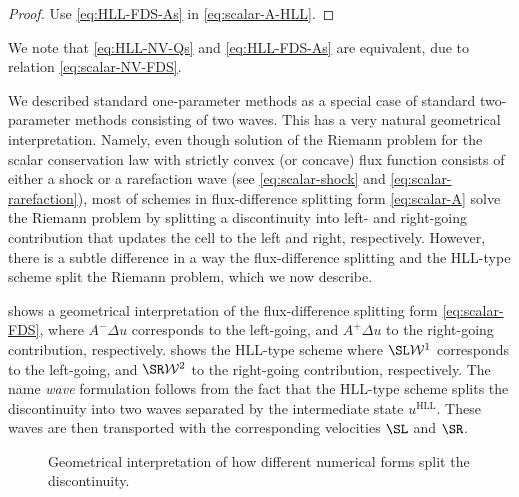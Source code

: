 \begin{proof}
Use \eqref{eq:HLL-FDS-As} in \eqref{eq:scalar-A-HLL}.
\end{proof}
We note that \eqref{eq:HLL-NV-Qs} and \eqref{eq:HLL-FDS-As} are equivalent, due to relation \eqref{eq:scalar-NV-FDS}.

We described standard one-parameter methods as a special case of standard two-parameter methods consisting of two waves. This has a very natural geometrical interpretation. Namely, even though solution of the Riemann problem for the scalar conservation law with strictly convex (or concave) flux function consists of either a shock or a rarefaction wave (see \eqref{eq:scalar-shock} and \eqref{eq:scalar-rarefaction}), most of schemes in flux-difference splitting form \eqref{eq:scalar-A} solve the Riemann problem by splitting a discontinuity into left- and right-going contribution that updates the cell to the left and right, respectively. However, there is a subtle difference in a way the flux-difference splitting and the HLL-type scheme split the Riemann problem, which we now describe.

 shows a geometrical interpretation of the flux-difference splitting form \eqref{eq:scalar-FDS}, where $ A^- \Delta u $ corresponds to the left-going, and $ A^+ \Delta u $ to the right-going contribution, respectively.  shows the HLL-type scheme where $ \SL \mathcal{W}^1 $ corresponds to the left-going, and $ \SR \mathcal{W}^2 $ to the right-going contribution, respectively. The name \textit{wave} formulation follows from the fact that the HLL-type scheme splits the discontinuity into two waves separated by the intermediate state $ u^\text{HLL} $. These waves are then transported with the corresponding velocities $ \SL $ and $ \SR $.
\begin{figure}[h!]
	\centering	
	
	\hspace{0.05\textwidth}
	
	\captionsetup{justification=centering}
	
	\caption{Geometrical interpretation of how different numerical forms split the discontinuity.}
	\label{fig:FDS-waves}
\end{figure} 

